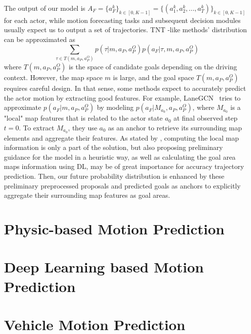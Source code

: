 The output of our model is $A_F = \{a_{F}^k\}_{k \in [0,K-1]}= \{(a_{1}^k,a_{2}^k,...,a_{T}^k)\}_{k \in [0,K-1]}$ for each actor, while motion forecasting tasks and subsequent decision modules usually expect us to output a set of trajectories. 
%
TNT \cite{zhao2020tnt}-like methods' distribution can be approximated as
\begin{equation}
	\sum_{\tau \in T(m, a_P, a^O_P)}{p(\tau|m, a_P, a^O_P)p(a_F|\tau, m, a_P, a^O_P)}
\end{equation}
where $T(m, a_P, a^O_P)$ is the space of candidate goals depending on the driving context.
However, the map space $m$ is large, and the goal space $T(m, a_P, a^O_P)$ requires careful design. In that sense, some methods expect to accurately predict the actor motion by extracting good features. For example, LaneGCN~\cite{liang2020learninggraph} tries to approximate $p(a_F|m, a_P, a^O_P)$ by modeling $p(a_F|M_{a_0}, a_P, a^O_P)$, where $M_{a_0}$ is a "local" map features that is related to the actor state $a_0$ at final observed step $t=0$. To extract $M_{a_0}$, they use $a_0$ as an anchor to retrieve its surrounding map elements and aggregate their features. As stated by \cite{wang2022ganet}, computing the local map information is only a part of the solution, but also proposing preliminary guidance for the model in a heuristic way, as well as calculating the goal area maps information using DL, may be of great importance for accuracy trajectory prediction. Then, our future probability distribution is enhanced by these preliminary preprocessed proposals and predicted goals as anchors to explicitly aggregate their surrounding map features as goal areas. 

\section{Physic-based Motion Prediction}
\label{sec:2_physic_based_mp}

\section{Deep Learning based Motion Prediction}
\label{sec:2_dl_based_mp}

\section{Vehicle Motion Prediction}
\label{sec:2_vehicle_based_mp}